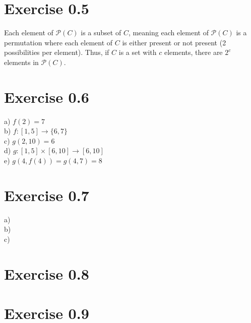 \documentclass{article}
\begin{document}
\section{Exercise 0.5}
Each element of $\mathcal{P}(C)$ is a subset of $C$, meaning each element of $\mathcal{P}(C)$ is a permutation where each element of $C$ is either present or not present (2 possibilities per element). Thus, if $C$ is a set with $c$ elements, there are $2^c$ elements in $\mathcal{P}(C)$.
\section{Exercise 0.6}
a) $f(2) = 7$
\\b) $f:[1, 5] \rightarrow \{6, 7\}$
\\c) $g(2, 10) = 6$
\\d) $g:[1, 5] \times [6, 10] \rightarrow [6, 10]$
\\e) $g(4, f(4)) = g(4, 7) = 8$
\section{Exercise 0.7}
a)
\\b)
\\c)
\section{Exercise 0.8}
\section{Exercise 0.9}
\end{document}

